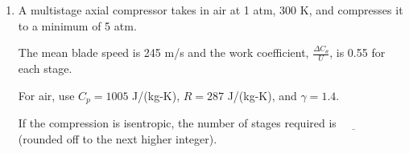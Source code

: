 \documentclass[journal,9pt,onecolumn]{IEEEtran}
\begin{document}
\begin{enumerate}
\item A multistage axial compressor takes in air at 1 atm, 300 K, and compresses it to a minimum of 5 atm.

The mean blade speed is 245 m/s and the work coefficient, $\frac{\Delta C_\theta}{U}$, is 0.55 for each stage.  

For air, use $C_p = 1005$ J/(kg-K), $R = 287$ J/(kg-K), and $\gamma = 1.4$.

If the compression is isentropic, the number of stages required is $\underline{\hspace{1cm}}$ (rounded off to the next higher integer).
\end{enumerate}
\end{document}
